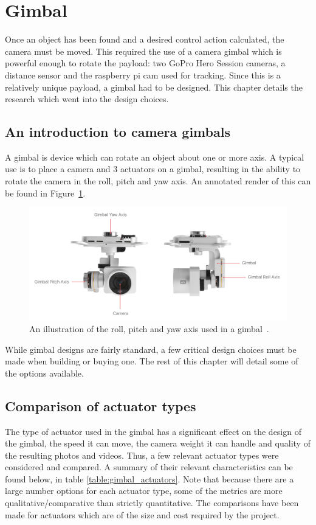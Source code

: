 \section{Gimbal}
Once an object has been found and a desired control action calculated, the camera must be moved. This required the use of a camera gimbal which is powerful enough to rotate the payload: two GoPro Hero Session cameras, a distance sensor and the raspberry pi cam used for tracking. Since this is a relatively unique payload, a gimbal had to be designed. This chapter details the research which went into the design choices.

\subsection{An introduction to camera gimbals}
A gimbal is device which can rotate an object about one or more axis. A typical use is to place a camera and 3 actuators on a gimbal, resulting in the ability to rotate the camera in the roll, pitch and yaw axis. An annotated render of this can be found in Figure~\ref{fig:roll_pitch_yaw_camera}.

\begin{figure}[h!]
  \centering
  \includegraphics[width=\textwidth]{literature_review/roll_pitch_yaw_gimbal.png}
  \caption{\label{fig:roll_pitch_yaw_camera} An illustration of the roll, pitch and yaw axis used in a gimbal~\cite{roll_pitch_yaw_camera}.}
\end{figure}

While gimbal designs are fairly standard, a few critical design choices must be made when building or buying one. The rest of this chapter will detail some of the options available.

\subsection{Comparison of actuator types}
The type of actuator used in the gimbal has a significant effect on the design of the gimbal, the speed it can move, the camera weight it can handle and quality of the resulting photos and videos. Thus, a few relevant actuator types were considered and compared. A summary of their relevant characteristics can be found below, in table \ref{table:gimbal_actuators}. Note that because there are a large number options for each actuator type, some of the metrics are more qualitative/comparative than strictly quantitative. The comparisons have been made for actuators which are of the size and cost required by the project.
\newline

